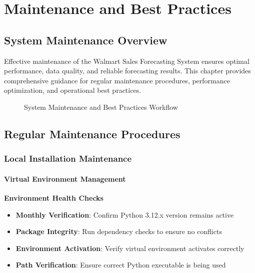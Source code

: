 %
%
%



\chapter{Maintenance and Best Practices}

\section{System Maintenance Overview}

Effective maintenance of the Walmart Sales Forecasting System ensures optimal performance, data quality, and reliable forecasting results. This chapter provides comprehensive guidance for regular maintenance procedures, performance optimization, and operational best practices.

\begin{figure}[H]
	\centering
	
	\caption{System Maintenance and Best Practices Workflow}
	\label{fig:maintenance_workflow}
\end{figure}

\section{Regular Maintenance Procedures}

\subsection{Local Installation Maintenance}

\subsubsection{Virtual Environment Management}

\textbf{Environment Health Checks}
\begin{itemize}
	\item \textbf{Monthly Verification}: Confirm Python 3.12.x version remains active
	\item \textbf{Package Integrity}: Run dependency checks to ensure no conflicts
	\item \textbf{Environment Activation}: Verify virtual environment activates correctly
	\item \textbf{Path Verification}: Ensure correct Python executable is being used
\end{itemize}

